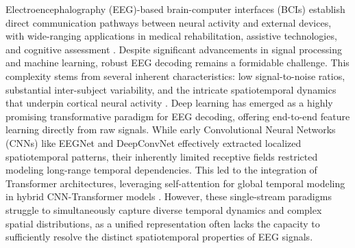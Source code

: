 \documentclass[journal]{IEEEtran}
\theoremstyle{plain}
\begin{document}
Electroencephalography (EEG)-based brain-computer interfaces (BCIs) establish direct communication pathways between neural activity and external devices, with wide-ranging applications in medical rehabilitation, assistive technologies, and cognitive assessment \cite{wolpaw2007brain,moghimi2013review}. Despite significant advancements in signal processing and machine learning, robust EEG decoding remains a formidable challenge. This complexity stems from several inherent characteristics: low signal-to-noise ratios, substantial inter-subject variability, and the intricate spatiotemporal dynamics that underpin cortical neural activity \cite{murad2024unveiling}. Deep learning has emerged as a highly promising transformative paradigm for EEG decoding, offering end-to-end feature learning directly from raw signals. While early Convolutional Neural Networks (CNNs) like EEGNet \cite{lawhern2018eegnet} and DeepConvNet \cite{schirrmeister2017deep} effectively extracted localized spatiotemporal patterns, their inherently limited receptive fields restricted modeling long-range temporal dependencies. This led to the integration of Transformer architectures, leveraging self-attention for global temporal modeling in hybrid CNN-Transformer models \cite{song2023eeg,xie2022transformer}. However, these single-stream paradigms struggle to simultaneously capture diverse temporal dynamics and complex spatial distributions, as a unified representation often lacks the capacity to sufficiently resolve the distinct spatiotemporal properties of EEG signals.
\end{document}
